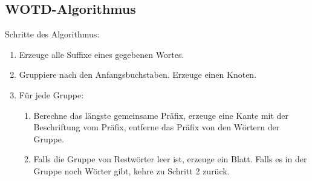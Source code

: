 \documentclass[12pt]{report}
\begin{document}
\subsection{WOTD-Algorithmus}
\label{sec:WOTDAlgorithmus}

Schritte des Algorithmus:

\begin{enumerate}
    \item Erzeuge alle Suffixe eines gegebenen Wortes.
    \item Gruppiere nach den Anfangsbuchstaben. Erzeuge einen Knoten.
    \item Für jede Gruppe:
    \begin{enumerate}
        \item Berechne das längste gemeinsame Präfix, erzeuge eine Kante mit der Beschriftung vom Präfix, entferne das Präfix von den Wörtern der Gruppe.
        \item Falls die Gruppe von Restwörter leer ist, erzeuge ein Blatt. Falls es in der Gruppe noch Wörter gibt, kehre zu Schritt 2 zurück.
    \end{enumerate}
\end{enumerate}
\end{document}
